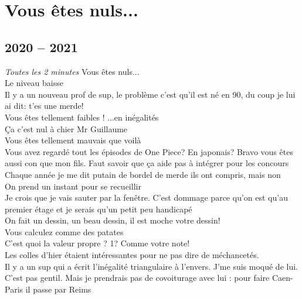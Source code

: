 \documentclass[french, a4paper, openany]{book}
\begin{document}
 \maketitle

\tableofcontents \newpage

\chapter{Vous êtes nuls...}

\section{2020 -- 2021}
	
	\noindent \emph{Toutes les 2 minutes} \og Vous êtes nuls... \fg \\
	\og Le niveau baisse \fg \\
	\og Il y a un nouveau prof de sup, le problème c'est qu'il est né en 90, du coup je lui ai dit: t'es une merde! \fg \\
	\og Vous êtes tellement faibles ! ...en inégalités \fg \\
	\og Ça c'est nul à chier Mr Guillaume \fg \\
	\og Vous êtes tellement mauvais que voilà \fg \\
	\og Vous avez regardé tout les épisodes de One Piece? En japonais? Bravo vous êtes aussi con que mon fils. Faut savoir que ça aide pas à intégrer pour les concours \fg \\
	\og Chaque année je me dit \fg putain de bordel de merde ils ont compris\og , mais non \fg \\
	\og On prend un instant pour se recueillir \fg \\
	\og Je crois que je vais sauter par la fenêtre. C'est dommage parce qu'on est qu'au premier étage et je serais qu'un petit peu handicapé \fg \\
	\og On fait un dessin, un beau dessin, il est moche votre dessin! \fg \\
	\og Vous calculez comme des patates \fg \\
	\og C'est quoi la valeur propre ? 1? Comme votre note! \fg \\
	\og Les colles d'hier étaient intéressantes pour ne pas dire de méchancetés. \fg \\
	\og Il y a un sup qui a écrit l'inégalité triangulaire à l'envers. J'me suis moqué de lui. C'est pas gentil. Mais je prendrais pas de covoiturage avec lui : pour faire Caen-Paris il passe par Reims \fg \\
\end{document}
